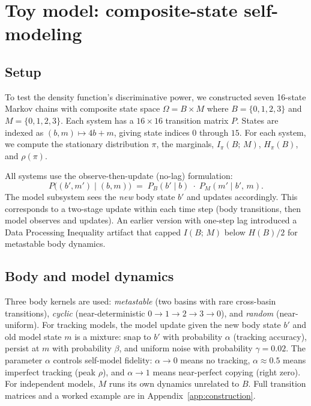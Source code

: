 \documentclass[12pt]{article}
\theoremstyle{remark}
\begin{document}

\section{Toy model: composite-state self-modeling}\label{sec:toy}

\subsection{Setup}

To test the density function's discriminative power, we constructed seven 16-state Markov chains with composite state space $\Omega = B \times M$ where $B = \{0,1,2,3\}$ and $M = \{0,1,2,3\}$. Each system has a $16 \times 16$ transition matrix $P$. States are indexed as $(b, m) \mapsto 4b + m$, giving state indices $0$ through $15$. For each system, we compute the stationary distribution $\pi$, the marginals, $I_\pi(B;\,M)$, $H_\pi(B)$, and $\rho(\pi)$.

All systems use the observe-then-update (no-lag) formulation:
\begin{equation}\label{eq:no-lag}
  P\bigl((b',m') \mid (b,m)\bigr) \;=\; P_B(b' \mid b)\;\cdot\; P_M(m' \mid b',\, m).
\end{equation}
The model subsystem sees the \emph{new} body state $b'$ and updates accordingly. This corresponds to a two-stage update within each time step (body transitions, then model observes and updates). An earlier version with one-step lag introduced a Data Processing Inequality artifact that capped $I(B;\,M)$ below $H(B)/2$ for metastable body dynamics.

\subsection{Body and model dynamics}\label{sec:body}

Three body kernels are used: \emph{metastable} (two basins with rare cross-basin transitions), \emph{cyclic} (near-deterministic $0 \to 1 \to 2 \to 3 \to 0$), and \emph{random} (near-uniform). For tracking models, the model update given the new body state $b'$ and old model state $m$ is a mixture: snap to $b'$ with probability $\alpha$ (tracking accuracy), persist at $m$ with probability $\beta$, and uniform noise with probability $\gamma = 0.02$. The parameter $\alpha$ controls self-model fidelity: $\alpha \to 0$ means no tracking, $\alpha \approx 0.5$ means imperfect tracking (peak $\rho$), and $\alpha \to 1$ means near-perfect copying (right zero). For independent models, $M$ runs its own dynamics unrelated to $B$. Full transition matrices and a worked example are in Appendix~\ref{app:construction}.
\end{document}
